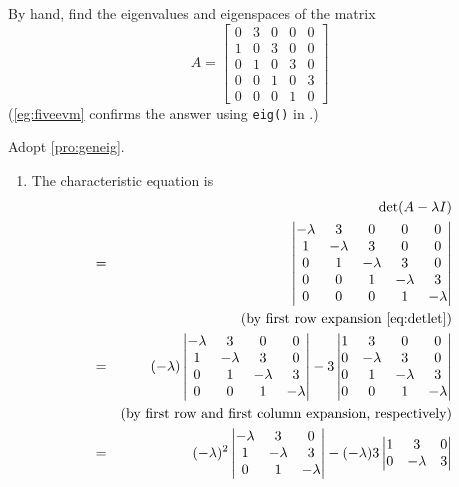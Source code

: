 \begin{example} \label{eg:fiveev}
By hand, find the eigenvalues and eigenspaces of the matrix
\begin{equation*}
A=\begin{bmatrix}0&3&0&0&0
\\1&0&3&0&0
\\0&1&0&3&0
\\0&0&1&0&3
\\0&0&0&1&0\end{bmatrix}
\end{equation*}
(\autoref{eg:fiveevm} confirms the answer using \verb|eig()| in \script.)
\begin{solution} 
Adopt \autoref{pro:geneig}.
\begin{enumerate}
\item The characteristic equation is
\begin{eqnarray*}
&&\det(A-\lambda I)
\\&=&\begin{vmatrix}-\lambda&3&0&0&0
\\1&-\lambda&3&0&0
\\0&1&-\lambda&3&0
\\0&0&1&-\lambda&3
\\0&0&0&1&-\lambda\end{vmatrix}
\\&&(\text{by first row expansion~\eqref{eq:detlet}})
\\&=&(-\lambda)\begin{vmatrix}-\lambda&3&0&0
\\1&-\lambda&3&0
\\0&1&-\lambda&3
\\0&0&1&-\lambda\end{vmatrix}
-3\begin{vmatrix}1&3&0&0
\\0&-\lambda&3&0
\\0&1&-\lambda&3
\\0&0&1&-\lambda\end{vmatrix}
\\&&(\text{by first row and first column expansion, respectively})
\\&=&(-\lambda)^2\begin{vmatrix}-\lambda&3&0
\\1&-\lambda&3
\\0&1&-\lambda\end{vmatrix}
-(-\lambda)3\begin{vmatrix}1&3&0
\\0&-\lambda&3

\end{vmatrix}
\end{eqnarray*}
\end{enumerate}
\end{solution}
\end{example}
